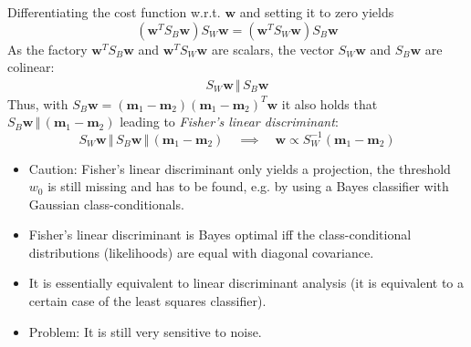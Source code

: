 \documentclass[a4paper, 11pt, accentcolor = tud3b]{tudreport}
\renewcommand{\vec}[1]{\mathbf{#1}}
\begin{document}
					Differentiating the cost function w.r.t. \(\vec{w}\) and setting it to zero yields
					\begin{equation}
						(\vec{w}^T S_B \vec{w}) S_W \vec{w} = (\vec{w}^T S_W \vec{w}) S_B \vec{w}
					\end{equation}
					As the factory \( \vec{w}^T S_B \vec{w} \) and \( \vec{w}^T S_W \vec{w} \) are scalars, the vector \( S_W \vec{w} \) and \( S_B \vec{w} \) are colinear:
					\begin{eqnarray}
						S_W \vec{w} \,\Vert\, S_B \vec{w}
					\end{eqnarray}
					Thus, with \( S_B \vec{w} = (\vec{m}_1 - \vec{m}_2) (\vec{m}_1 - \vec{m}_2)^T \vec{w} \) it also holds that \( S_B \vec{w} \,\Vert\, (\vec{m}_1 - \vec{m}_2) \) leading to \emph{Fisher's linear discriminant}:
					\begin{equation}
						S_W \vec{w} \,\Vert\, S_B \vec{w} \,\Vert\, (\vec{m}_1 - \vec{m}_2) \quad\implies\quad \vec{w} \propto S_W^{-1} (\vec{m}_1 - \vec{m}_2)
					\end{equation}
					
					\begin{itemize}
						\item Caution: Fisher's linear discriminant only yields a projection, the threshold \(w_0\) is still missing and has to be found, e.g. by using a Bayes classifier with Gaussian class-conditionals.
						\item Fisher's linear discriminant is Bayes optimal iff the class-conditional distributions (likelihoods) are equal with diagonal covariance.
						\item It is essentially equivalent to linear discriminant analysis (it is equivalent to a certain case of the least squares classifier).
						\item Problem: It is still very sensitive to noise.
					\end{itemize}
\end{document}

